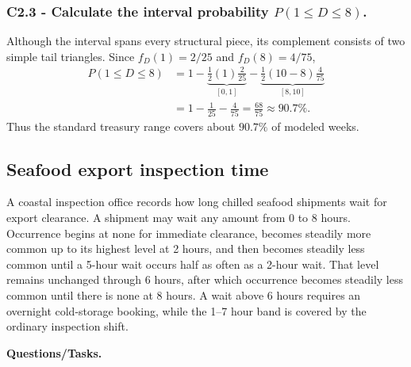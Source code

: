 \subsubsection*{C2.3 - Calculate the interval probability $P(1\le D\le8)$.}
\label{subsec:c2-piecewise-linear-liquidity-c}
Although the interval spans every structural piece, its complement consists
of two simple tail triangles.  Since $f_D(1)=2/25$ and $f_D(8)=4/75$,
\[
 \begin{aligned}
 P(1\le D\le8)
 &=1-\underbrace{\frac12(1)\frac2{25}}_{[0,1]}
     -\underbrace{\frac12(10-8)\frac4{75}}_{[8,10]}\\
 &=1-\frac1{25}-\frac4{75}=\frac{68}{75}\approx90.7\%.
 \end{aligned}
\]
Thus the standard treasury range covers about $90.7\%$ of modeled weeks.

\subsection{Seafood export inspection time}\label{sec:c2-piecewise-linear-inspection}
A coastal inspection office records how long chilled seafood shipments wait
for export clearance.  A shipment may wait any amount from 0 to 8 hours.
Occurrence begins at none for immediate clearance, becomes steadily
more common up to its highest level at 2 hours, and then becomes steadily less
common until a 5-hour wait occurs half as often as a 2-hour wait.  That level
remains unchanged through 6 hours, after which occurrence becomes steadily less
common until there is none at 8 hours.  A wait above 6 hours requires
an overnight cold-storage booking, while the 1--7 hour band is covered by the
ordinary inspection shift.

\begingroup{}
\endgroup

\textbf{Questions/Tasks.}
\begin{enumerate}
\end{enumerate}

